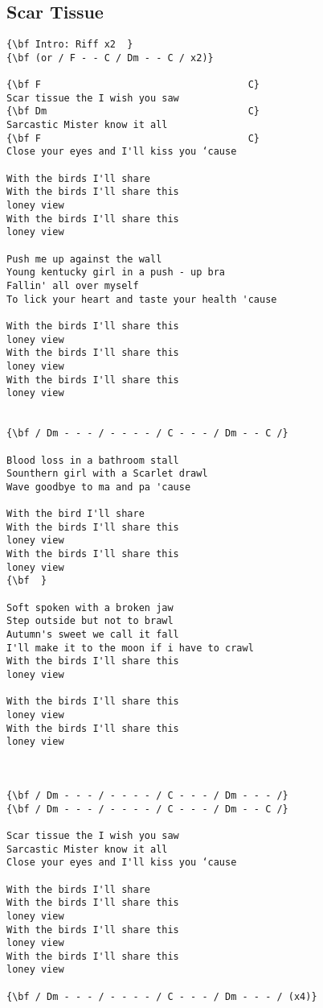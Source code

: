 \documentclass[a4paper]{article}
\begin{document}
\subsection{Scar Tissue} %
\label{sub:Scar Tissue}
\begin{multicols}{2}
\begin{Verbatim}[commandchars=\\\{\}]
{\bf Intro: Riff x2  }
{\bf (or / F - - C / Dm - - C / x2)}

{\bf F                                    C}
Scar tissue the I wish you saw
{\bf Dm                                   C}
Sarcastic Mister know it all
{\bf F                                    C}
Close your eyes and I'll kiss you ‘cause

With the birds I'll share
With the birds I'll share this
loney view
With the birds I'll share this
loney view

Push me up against the wall
Young kentucky girl in a push - up bra
Fallin' all over myself
To lick your heart and taste your health 'cause

With the birds I'll share this
loney view
With the birds I'll share this
loney view
With the birds I'll share this
loney view


{\bf / Dm - - - / - - - - / C - - - / Dm - - C /}

Blood loss in a bathroom stall
Sounthern girl with a Scarlet drawl
Wave goodbye to ma and pa 'cause

With the bird I'll share
With the birds I'll share this
loney view
With the birds I'll share this
loney view
{\bf  }

Soft spoken with a broken jaw
Step outside but not to brawl
Autumn's sweet we call it fall
I'll make it to the moon if i have to crawl
With the birds I'll share this
loney view

With the birds I'll share this
loney view
With the birds I'll share this
loney view



{\bf / Dm - - - / - - - - / C - - - / Dm - - - /}
{\bf / Dm - - - / - - - - / C - - - / Dm - - C /}

Scar tissue the I wish you saw
Sarcastic Mister know it all
Close your eyes and I'll kiss you ‘cause

With the birds I'll share
With the birds I'll share this
loney view
With the birds I'll share this
loney view
With the birds I'll share this
loney view

{\bf / Dm - - - / - - - - / C - - - / Dm - - - / (x4)}
\end{Verbatim}
\end{multicols}
\newpage
\end{document}
